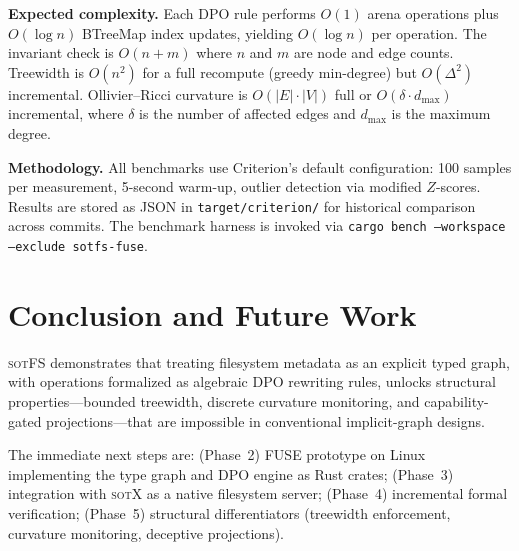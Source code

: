 \documentclass[11pt,a4paper]{article}
\theoremstyle{definition}
\newcommand{\sotfs}{\textsc{sotFS}}
\newcommand{\sotos}{\textsc{sotX}}
\begin{document}
\textbf{Expected complexity.}  Each DPO rule performs $O(1)$ arena
operations plus $O(\log n)$ BTreeMap index updates, yielding $O(\log n)$
per operation.  The invariant check is $O(n + m)$ where $n$ and $m$ are
node and edge counts.  Treewidth is $O(n^2)$ for a full recompute
(greedy min-degree) but $O(\Delta^2)$ incremental.  Ollivier--Ricci
curvature is $O(|E| \cdot |V|)$ full or $O(\delta \cdot d_{\max})$
incremental, where $\delta$ is the number of affected edges and
$d_{\max}$ is the maximum degree.

\textbf{Methodology.}  All benchmarks use Criterion's default configuration:
100 samples per measurement, 5-second warm-up, outlier detection via
modified $Z$-scores.  Results are stored as JSON in \texttt{target/criterion/}
for historical comparison across commits.  The benchmark harness is
invoked via \texttt{cargo bench --workspace --exclude sotfs-fuse}.

\section{Conclusion and Future Work}

\sotfs{} demonstrates that treating filesystem metadata as an explicit typed
graph, with operations formalized as algebraic DPO rewriting rules, unlocks
structural properties---bounded treewidth, discrete curvature monitoring,
and capability-gated projections---that are impossible in conventional
implicit-graph designs.

The immediate next steps are: (Phase~2) FUSE prototype on Linux implementing
the type graph and DPO engine as Rust crates; (Phase~3) integration with
\sotos{} as a native filesystem server; (Phase~4) incremental formal
verification; (Phase~5) structural differentiators (treewidth enforcement,
curvature monitoring, deceptive projections).

\end{document}

